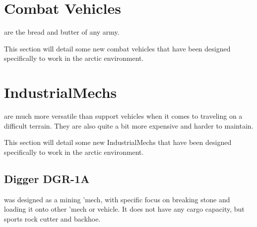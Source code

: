 \documentclass{tufte-book}
\begin{document}
\chapter{Combat Vehicles}
\label{ch:combat-vehicles}


 are the bread and butter of any army.

This section will detail some new combat vehicles that have been
designed specifically to work in the arctic environment.





\chapter{IndustrialMechs}
\label{ch:industrialmechs}


 are much more versatile than support vehicles
when it comes to traveling on a difficult terrain. They are also quite
a bit more expensive and harder to maintain.

This section will detail some new IndustrialMechs that have been
designed specifically to work in the arctic environment.


\section{Digger DGR-1A}
 was designed as a mining 'mech, with specific focus
on breaking stone and loading it onto other 'mech or vehicle. It does not
have any cargo capacity, but sports rock cutter and backhoe.
\end{document}

